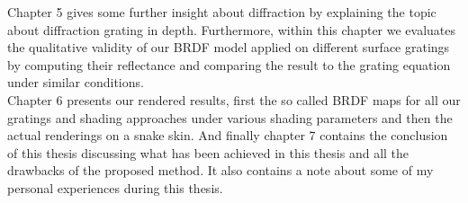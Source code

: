 Chapter 5 gives some further insight about diffraction by explaining the topic about diffraction grating in depth. Furthermore, within this chapter we evaluates the qualitative validity of our BRDF model applied on different surface gratings by computing their reflectance and comparing the result to the grating equation under similar conditions. \\

Chapter 6 presents our rendered results, first the so called BRDF maps for all our gratings and shading approaches under various shading parameters and then the actual renderings on a snake skin. And finally chapter 7 contains the conclusion of this thesis discussing what has been achieved in this thesis and all the drawbacks of the proposed method. It also contains a note about some of my personal experiences during this thesis.
